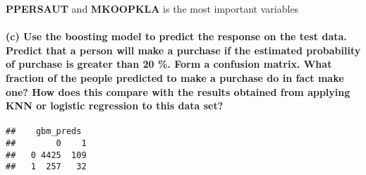 \documentclass[
]{article}
\newenvironment{Shaded}{\begin{snugshade}}{\end{snugshade}}
\newcommand{\AttributeTok}[1]{\textcolor[rgb]{0.77,0.63,0.00}{#1}}
\newcommand{\DecValTok}[1]{\textcolor[rgb]{0.00,0.00,0.81}{#1}}
\newcommand{\FloatTok}[1]{\textcolor[rgb]{0.00,0.00,0.81}{#1}}
\newcommand{\FunctionTok}[1]{\textcolor[rgb]{0.00,0.00,0.00}{#1}}
\newcommand{\NormalTok}[1]{#1}
\newcommand{\OtherTok}[1]{\textcolor[rgb]{0.56,0.35,0.01}{#1}}
\newcommand{\SpecialCharTok}[1]{\textcolor[rgb]{0.00,0.00,0.00}{#1}}
\newcommand{\StringTok}[1]{\textcolor[rgb]{0.31,0.60,0.02}{#1}}
\begin{document}
\textbf{PPERSAUT} and \textbf{MKOOPKLA} is the most important variables

\hypertarget{c-use-the-boosting-model-to-predict-the-response-on-the-test-data.-predict-that-a-person-will-make-a-purchase-if-the-estimated-probability-of-purchase-is-greater-than-20-.-form-a-confusion-matrix.-what-fraction-of-the-people-predicted-to-make-a-purchase-do-in-fact-make-one-how-does-this-compare-with-the-results-obtained-from-applying-knn-or-logistic-regression-to-this-data-set}{%
\paragraph{(c) Use the boosting model to predict the response on the
test data. Predict that a person will make a purchase if the estimated
probability of purchase is greater than 20 \%. Form a confusion matrix.
What fraction of the people predicted to make a purchase do in fact make
one? How does this compare with the results obtained from applying KNN
or logistic regression to this data
set?}\label{c-use-the-boosting-model-to-predict-the-response-on-the-test-data.-predict-that-a-person-will-make-a-purchase-if-the-estimated-probability-of-purchase-is-greater-than-20-.-form-a-confusion-matrix.-what-fraction-of-the-people-predicted-to-make-a-purchase-do-in-fact-make-one-how-does-this-compare-with-the-results-obtained-from-applying-knn-or-logistic-regression-to-this-data-set}}

\begin{Shaded}
\end{Shaded}

\begin{verbatim}
##    gbm_preds
##        0    1
##   0 4425  109
##   1  257   32
\end{verbatim}
\end{document}
